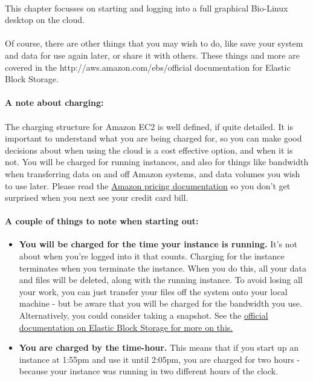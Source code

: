 \paragraph{}This chapter focusses on starting and logging into a full graphical Bio-Linux desktop on the cloud.

\paragraph{}Of course, there are other things that you may wish to do, like save your system and data for use again later, or share it with others. These things and more are covered in the {http://aws.amazon.com/ebs/}{official documentation for Elastic Block Storage}.

\paragraph{A note about charging:} 
\paragraph{}The charging structure for Amazon EC2 is well defined, if quite detailed. It is important to understand what you are being charged for, so you can make good decisions about when using the cloud is a cost effective option, and when it is not. You will be charged for running instances, and also for things like bandwidth when transferring data on and off Amazon systems, and data volumes you wish to use later. Please read the \href{http://aws.amazon.com/ec2/pricing/}{Amazon pricing documentation} so you don't get surprised when you next see your credit card bill. 
\paragraph{A couple of things to note when starting out:}
\begin{itemize}
\item \textbf{You will be charged for the time your instance is running.} It's not about when you're logged into it that counts. Charging for the instance terminates when you terminate the instance. When you do this, all your data and files will be deleted, along with the running instance. To avoid losing all your work, you can just transfer your files off the system onto your local machine - but be aware that you will be charged for the bandwidth you use. Alternatively, you could consider taking a snapshot. See the \href{http://aws.amazon.com/ebs/}{official documentation on Elastic Block Storage for more on this.} 
\item \textbf{You are charged by the time-hour.} This means that if you start up an instance at 1:55pm and use it until 2:05pm, you are charged for two hours - because your instance was running in two different hours of the clock. 

\end{itemize}

